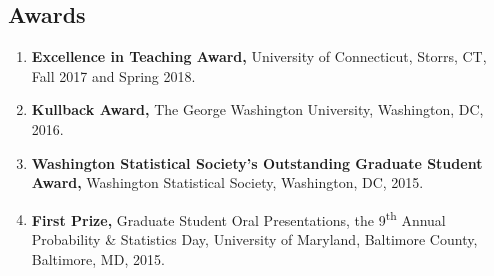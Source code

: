 \documentclass[margin]{res}
\begin{document}
\begin{resume}
\section{Awards}
\begin{enumerate}
	\item {\bf Excellence in Teaching Award,} University of Connecticut, Storrs, CT, Fall 2017 and Spring 2018.
	\item {\bf Kullback Award,} The George Washington University, Washington, DC, 2016.
	\item {\bf Washington Statistical Society's Outstanding Graduate Student Award,} Washington Statistical Society, Washington, DC, 2015.
	\item {\bf First Prize,} Graduate Student Oral Presentations, the 9\textsuperscript{th} Annual Probability \& Statistics Day,  University of Maryland, Baltimore County, Baltimore, MD, 2015.
\end{enumerate}
\end{resume} 
\end{document}
